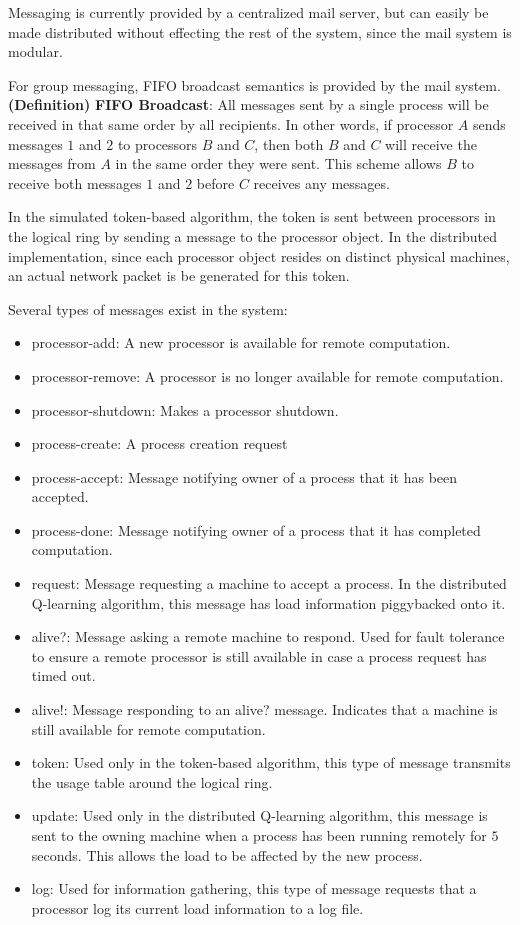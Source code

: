 \documentclass{report}
\newcommand{\definition}[3]{
	\textbf{(Definition)} \textbf{#1}: #2
	\label{#3}
}
\begin{document}
Messaging is currently provided by a centralized mail server, but can easily
be made distributed without effecting the rest of the system, since the mail
system is modular.

For group messaging, FIFO broadcast semantics is provided by the mail
system.  \definition{FIFO Broadcast}{All messages sent by a single process
will be received in that same order by all recipients. In other words, if
processor $A$ sends messages $1$ and $2$ to processors $B$ and $C$, then
both $B$ and $C$ will receive the messages from $A$ in the same order they
were sent. This scheme allows $B$ to receive both messages $1$ and $2$
before $C$ receives any messages.}{def:fifo_broadcast}

In the simulated token-based algorithm, the token is sent between processors
in the logical ring by sending a message to the processor object.  In the
distributed implementation, since each processor object resides on distinct
physical machines, an actual network packet is be generated for this token.

Several types of messages exist in the system:

\begin{itemize}
	\item processor-add: A new processor is available for remote
		 computation.
	\item processor-remove: A processor is no longer available for
		 remote computation.
	\item processor-shutdown: Makes a processor shutdown.
	\item process-create: A process creation request
	\item process-accept: Message notifying owner of a process that it
		 has been accepted.
	\item process-done:  Message notifying owner of a process that it
		 has completed computation.
	\item request: Message requesting a machine to accept a process.
		 In the distributed Q-learning algorithm, this message has
		 load information piggybacked onto it.
	\item alive?: Message asking a remote machine to respond.  Used for
		 fault tolerance to ensure a remote processor is still
		 available in case a process request has timed out.
	\item alive!: Message responding to an alive? message.  Indicates
		 that a machine is still available for remote computation.
	\item token:  Used only in the token-based algorithm, this type of
		 message transmits the usage table around the logical ring.
	\item update: Used only in the distributed Q-learning algorithm,
		 this message is sent to the owning machine when a process
		 has been running remotely for $5$ seconds.  This allows the
		 load to be affected by the new process.
	\item log: Used for information gathering, this type of message
		 requests that a processor log its current load information
		 to a log file.
\end{itemize}
\end{document}
